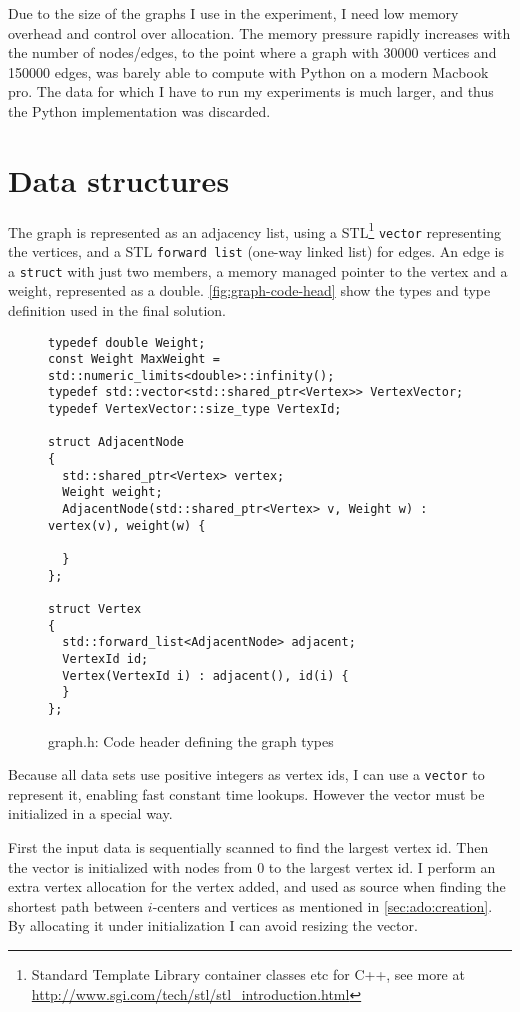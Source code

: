 Due to the size of the graphs I use in the experiment, I need low memory
overhead and control over allocation. The memory pressure rapidly increases
with the number of nodes/edges, to the point where a graph with 30000 vertices
and 150000 edges, was barely able to compute with Python on a modern Macbook
pro. The data for which I have to run my experiments is much larger, and thus
the Python implementation was discarded.

\section{Data structures}

The graph is represented as an adjacency list, using a STL\footnote{Standard
Template Library container classes etc for C++, see more at
\url{http://www.sgi.com/tech/stl/stl_introduction.html}} \texttt{vector}
representing the vertices, and a STL \texttt{forward list} (one-way linked
list) for edges. An edge is a \texttt{struct} with just two members, a
memory managed pointer to the vertex and a weight, represented as a double.
\autoref{fig:graph-code-head} show the types and type definition used in the
final solution.

\begin{figure}
\lstset{language=C++}
\begin{lstlisting}
typedef double Weight;
const Weight MaxWeight = std::numeric_limits<double>::infinity();
typedef std::vector<std::shared_ptr<Vertex>> VertexVector;
typedef VertexVector::size_type VertexId;

struct AdjacentNode
{
  std::shared_ptr<Vertex> vertex;
  Weight weight;
  AdjacentNode(std::shared_ptr<Vertex> v, Weight w) : vertex(v), weight(w) {

  }
};

struct Vertex
{
  std::forward_list<AdjacentNode> adjacent;
  VertexId id;
  Vertex(VertexId i) : adjacent(), id(i) {
  }
};
\end{lstlisting}
\caption{graph.h: Code header defining the graph types}
\label{fig:graph-code-head}

\end{figure}

Because all data sets use positive integers as vertex ids, I can use a
\texttt{vector} to represent it, enabling fast constant time lookups. 
However the vector must be initialized in a special way.

First the input data is sequentially scanned to find the largest vertex
id. Then the vector is initialized with nodes from $0$ to the largest
vertex id. I perform an extra vertex allocation for the vertex added, and used
as source when finding the shortest path between $i$-centers and vertices as
mentioned in \autoref{sec:ado:creation}. By allocating it under initialization I
can avoid resizing the vector.

